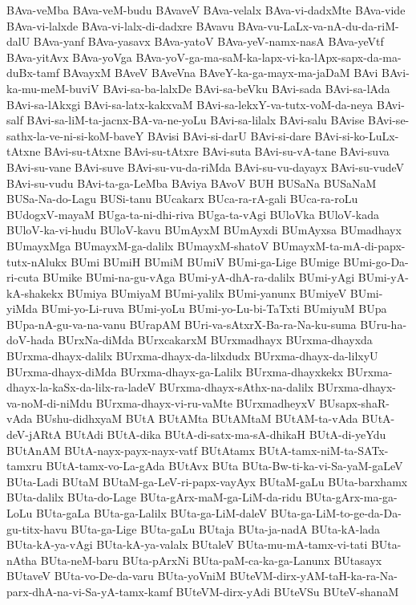 {BAva-veMba
BAva-veM-budu
BAvaveV
BAva-velalx
BAva-vi-dadxMte
BAva-vide
BAva-vi-lalxde
BAva-vi-lalx-di-dadxre
BAvavu
BAva-vu-LaLx-va-nA-du-da-riM-dalU
BAva-yanf
BAva-yasavx
BAva-yatoV
BAva-yeV-namx-nasA
BAva-yeVtf
BAva-yitAvx
BAva-yoVga
BAva-yoV-ga-ma-saM-ka-lapx-vi-ka-lApx-sapx-da-ma-duBx-tamf
BAvayxM
BAveV
BAveVna
BAveY-ka-ga-mayx-ma-jaDaM
BAvi
BAvi-ka-mu-meM-buviV
BAvi-sa-ba-lalxDe
BAvi-sa-beVku
BAvi-sada
BAvi-sa-lAda
BAvi-sa-lAkxgi
BAvi-sa-latx-kakxvaM
BAvi-sa-lekxY-va-tutx-voM-da-neya
BAvi-salf
BAvi-sa-liM-ta-jacnx-BA-va-ne-yoLu
BAvi-sa-lilalx
BAvi-salu
BAvise
BAvi-se-sathx-la-ve-ni-si-koM-baveY
BAvisi
BAvi-si-darU
BAvi-si-dare
BAvi-si-ko-LuLx-tAtxne
BAvi-su-tAtxne
BAvi-su-tAtxre
BAvi-suta
BAvi-su-vA-tane
BAvi-suva
BAvi-su-vane
BAvi-suve
BAvi-su-vu-da-riMda
BAvi-su-vu-dayayx
BAvi-su-vudeV
BAvi-su-vudu
BAvi-ta-ga-LeMba
BAviya
BAvoV
BUH
BUSaNa
BUSaNaM
BUSa-Na-do-Lagu
BUSi-tanu
BUcakarx
BUca-ra-rA-gali
BUca-ra-roLu
BUdogxV-mayaM
BUga-ta-ni-dhi-riva
BUga-ta-vAgi
BUloVka
BUloV-kada
BUloV-ka-vi-hudu
BUloV-kavu
BUmAyxM
BUmAyxdi
BUmAyxsa
BUmadhayx
BUmayxMga
BUmayxM-ga-dalilx
BUmayxM-shatoV
BUmayxM-ta-mA-di-papx-tutx-nAlukx
BUmi
BUmiH
BUmiM
BUmiV
BUmi-ga-Lige
BUmige
BUmi-go-Da-ri-cuta
BUmike
BUmi-na-gu-vAga
BUmi-yA-dhA-ra-dalilx
BUmi-yAgi
BUmi-yA-kA-shakekx
BUmiya
BUmiyaM
BUmi-yalilx
BUmi-yanunx
BUmiyeV
BUmi-yiMda
BUmi-yo-Li-ruva
BUmi-yoLu
BUmi-yo-Lu-bi-TaTxti
BUmiyuM
BUpa
BUpa-nA-gu-va-na-vanu
BUrapAM
BUri-va-sAtxrX-Ba-ra-Na-ku-suma
BUru-ha-doV-hada
BUrxNa-diMda
BUrxcakarxM
BUrxmadhayx
BUrxma-dhayxda
BUrxma-dhayx-dalilx
BUrxma-dhayx-da-lilxdudx
BUrxma-dhayx-da-lilxyU
BUrxma-dhayx-diMda
BUrxma-dhayx-ga-Lalilx
BUrxma-dhayxkekx
BUrxma-dhayx-la-kaSx-da-lilx-ra-ladeV
BUrxma-dhayx-sAthx-na-dalilx
BUrxma-dhayx-va-noM-di-niMdu
BUrxma-dhayx-vi-ru-vaMte
BUrxmadheyxV
BUsapx-shaR-vAda
BUshu-didhxyaM
BUtA
BUtAMta
BUtAMtaM
BUtAM-ta-vAda
BUtA-deV-jARtA
BUtAdi
BUtA-dika
BUtA-di-satx-ma-sA-dhikaH
BUtA-di-yeYdu
BUtAnAM
BUtA-nayx-payx-nayx-vatf
BUtAtamx
BUtA-tamx-niM-ta-SATx-tamxru
BUtA-tamx-vo-La-gAda
BUtAvx
BUta
BUta-Bw-ti-ka-vi-Sa-yaM-gaLeV
BUta-Ladi
BUtaM
BUtaM-ga-LeV-ri-papx-vayAyx
BUtaM-gaLu
BUta-barxhamx
BUta-dalilx
BUta-do-Lage
BUta-gArx-maM-ga-LiM-da-ridu
BUta-gArx-ma-ga-LoLu
BUta-gaLa
BUta-ga-Lalilx
BUta-ga-LiM-daleV
BUta-ga-LiM-to-ge-da-Da-gu-titx-havu
BUta-ga-Lige
BUta-gaLu
BUtaja
BUta-ja-nadA
BUta-kA-lada
BUta-kA-ya-vAgi
BUta-kA-ya-valalx
BUtaleV
BUta-mu-mA-tamx-vi-tati
BUta-nAtha
BUta-neM-baru
BUta-pArxNi
BUta-paM-ca-ka-ga-Lanunx
BUtasayx
BUtaveV
BUta-vo-De-da-varu
BUta-yoVniM
BUteVM-dirx-yAM-taH-ka-ra-Na-parx-dhA-na-vi-Sa-yA-tamx-kamf
BUteVM-dirx-yAdi
BUteVSu
BUteV-shanaM
}
